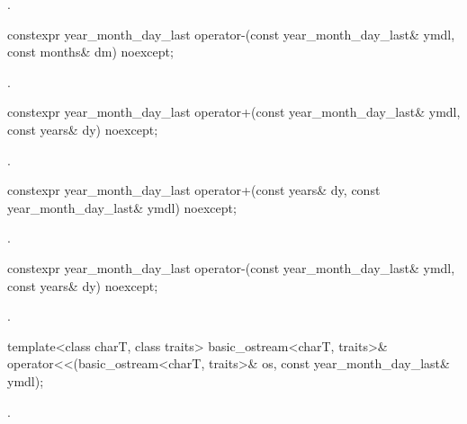 \begin{itemdescr}
\pnum
\returns {}.
\end{itemdescr}

%
\begin{itemdecl}
constexpr year_month_day_last
  operator-(const year_month_day_last& ymdl, const months& dm) noexcept;
\end{itemdecl}

\begin{itemdescr}
\pnum
\returns {}.
\end{itemdescr}

%
\begin{itemdecl}
constexpr year_month_day_last
  operator+(const year_month_day_last& ymdl, const years& dy) noexcept;
\end{itemdecl}

\begin{itemdescr}
\pnum
\returns {}.
\end{itemdescr}

%
\begin{itemdecl}
constexpr year_month_day_last
  operator+(const years& dy, const year_month_day_last& ymdl) noexcept;
\end{itemdecl}

\begin{itemdescr}
\pnum
\returns {}.
\end{itemdescr}

%
\begin{itemdecl}
constexpr year_month_day_last
  operator-(const year_month_day_last& ymdl, const years& dy) noexcept;
\end{itemdecl}

\begin{itemdescr}
\pnum
\returns {}.
\end{itemdescr}

%
\begin{itemdecl}
template<class charT, class traits>
  basic_ostream<charT, traits>&
    operator<<(basic_ostream<charT, traits>& os, const year_month_day_last& ymdl);
\end{itemdecl}

\begin{itemdescr}
\pnum
\returns {}.
\end{itemdescr}


